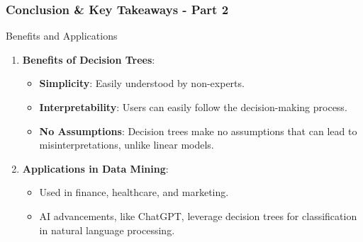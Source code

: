 \documentclass[aspectratio=169]{beamer}
\begin{document}
\begin{frame}[fragile]
    \frametitle{Conclusion \& Key Takeaways - Part 2}
    \begin{block}{Benefits and Applications}
        \begin{enumerate}
            \item \textbf{Benefits of Decision Trees}:
            \begin{itemize}
                \item \textbf{Simplicity}: Easily understood by non-experts.
                \item \textbf{Interpretability}: Users can easily follow the decision-making process.
                \item \textbf{No Assumptions}: Decision trees make no assumptions that can lead to misinterpretations, unlike linear models.
            \end{itemize}
            
            \item \textbf{Applications in Data Mining}:
            \begin{itemize}
                \item Used in finance, healthcare, and marketing.
                \item AI advancements, like ChatGPT, leverage decision trees for classification in natural language processing.
            \end{itemize}
        \end{enumerate}
    \end{block}
\end{frame}
\end{document}
